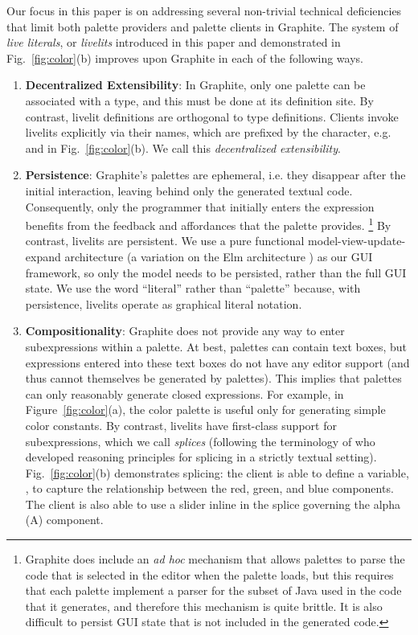 Our focus in this paper is on addressing several non-trivial technical
deficiencies that limit both palette providers and palette clients in Graphite.
The system of \emph{live literals}, or \emph{livelits} introduced in
this paper and demonstrated in Fig.~\ref{fig:color}(b) improves upon Graphite
in each of the following ways.
\begin{enumerate}
  \setlength\itemsep{0.5em}
  \item \textbf{Decentralized Extensibility}:
    In Graphite, only one palette can be associated with a type, and this must
    be done at its definition site.
    By contrast, livelit definitions are orthogonal to type definitions.
    Clients invoke livelits explicitly via their names, which are prefixed by the \li{\$} character,
    e.g.  and  in Fig.~\ref{fig:color}(b).
    We call this \emph{decentralized extensibility}.
  \item \textbf{Persistence}: Graphite's palettes are {ephemeral},
  i.e. they disappear after the initial interaction,
  leaving behind only the generated textual code.
  Consequently, only the programmer that initially enters the expression
  benefits from the feedback and affordances that the palette provides.%
  \footnote{Graphite does include an \emph{ad hoc} mechanism that
  allows palettes to parse the code that is selected in the editor
  when the palette loads, but this requires that each palette implement
  a parser for the subset of Java used in the code that it generates,
  and therefore this mechanism is quite brittle. It is also difficult
  to persist GUI state that is not included in the generated code.}
  By contrast, livelits are persistent. We use a pure functional model-view-update-expand architecture
  (a variation on the Elm architecture \cite{ElmArchitecture}) as our GUI framework,
  so only the model needs to be persisted, rather than the full GUI state.
  We use the word ``literal'' rather than ``palette'' because, with persistence, livelits
  operate as graphical literal notation.

  \item \textbf{Compositionality}:
  Graphite does not provide any way to {enter subexpressions within a palette}.
  At best, palettes can contain text boxes, but expressions entered into these text boxes
  do not have any editor support (and thus cannot themselves be generated by palettes).
  This implies that palettes can only reasonably generate {closed expressions}.
  For example, in Figure~\ref{fig:color}(a), the color palette
  is useful only for generating simple color constants.
  By contrast, livelits have first-class support for subexpressions, which we call \emph{splices} (following
  the terminology of \citet{TLMs} who developed reasoning principles for splicing in a strictly textual setting).
  Fig.~\ref{fig:color}(b) demonstrates splicing: the client is able to define a variable, ,
  to capture the relationship between the red, green, and blue components.
  The client is also able to use a slider inline in the splice governing
  the alpha (A) component.


\end{enumerate}

